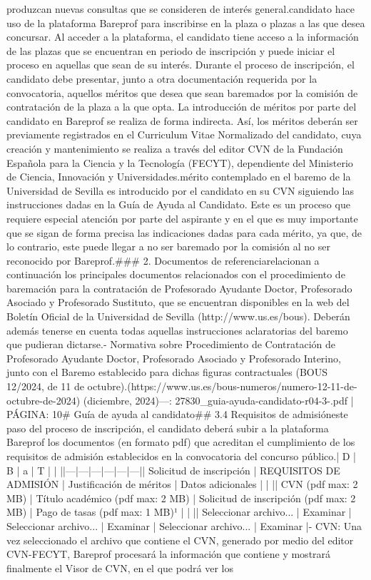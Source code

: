 \documentclass{article}
\begin{document}
\begin{itemize}
produzcan nuevas consultas que se consideren de interés general.\n\nCada candidato hace uso de la plataforma Bareprof para inscribirse en la plaza o plazas a las que desea concursar. Al acceder a la plataforma, el candidato tiene acceso a la información de las plazas que se encuentran en periodo de inscripción y puede iniciar el proceso en aquellas que sean de su interés. Durante el proceso de inscripción, el candidato debe presentar, junto a otra documentación requerida por la convocatoria, aquellos méritos que desea que sean baremados por la comisión de contratación de la plaza a la que opta. La introducción de méritos por parte del candidato en Bareprof se realiza de forma indirecta. Así, los méritos deberán ser previamente registrados en el Curriculum Vitae Normalizado del candidato, cuya creación y mantenimiento se realiza a través del editor CVN de la Fundación Española para la Ciencia y la Tecnología (FECYT), dependiente del Ministerio de Ciencia, Innovación y Universidades.\n\nCada mérito contemplado en el baremo de la Universidad de Sevilla es introducido por el candidato en su CVN siguiendo las instrucciones dadas en la Guía de Ayuda al Candidato. Este es un proceso que requiere especial atención por parte del aspirante y en el que es muy importante que se sigan de forma precisa las indicaciones dadas para cada mérito, ya que, de lo contrario, este puede llegar a no ser baremado por la comisión al no ser reconocido por Bareprof.\n\n### 2. Documentos de referencia\n\nSe relacionan a continuación los principales documentos relacionados con el procedimiento de baremación para la contratación de Profesorado Ayudante Doctor, Profesorado Asociado y Profesorado Sustituto, que se encuentran disponibles en la web del Boletín Oficial de la Universidad de Sevilla (http://www.us.es/bous). Deberán además tenerse en cuenta todas aquellas instrucciones aclaratorias del baremo que pudieran dictarse.\n\n- Normativa sobre Procedimiento de Contratación de Profesorado Ayudante Doctor, Profesorado Asociado y Profesorado Interino, junto con el Baremo establecido para dichas figuras contractuales (BOUS 12/2024, de 11 de octubre).(https://www.us.es/bous-numeros/numero-12-11-de-octubre-de-2024)\n{} (diciembre, 2024)\n\n---\n\nFUENTE: 27830_guia-ayuda-candidato-r04-3-.pdf | PÁGINA: 10\n# Guía de ayuda al candidato\n\n## 3.4 Requisitos de admisión\n\nEn este paso del proceso de inscripción, el candidato deberá subir a la plataforma Bareprof los documentos (en formato pdf) que acreditan el cumplimiento de los requisitos de admisión establecidos en la convocatoria del concurso público.\n\n| D | B | a | T | | |\n|---|---|---|---|---|---|\n| Solicitud de inscripción | REQUISITOS DE ADMISIÓN | Justificación de méritos | Datos adicionales | | |\n| CVN (pdf max: 2 MB) | Título académico (pdf max: 2 MB) | Solicitud de inscripción (pdf max: 2 MB) | Pago de tasas (pdf max: 1 MB)¹ | | |\n| Seleccionar archivo... | Examinar | Seleccionar archivo... | Examinar | Seleccionar archivo... | Examinar |\n\n- CVN: Una vez seleccionado el archivo que contiene el CVN, generado por medio del editor CVN-FECYT, Bareprof procesará la información que contiene y mostrará finalmente el Visor de CVN, en el que podrá ver los 
\end{itemize}
\end{document}
